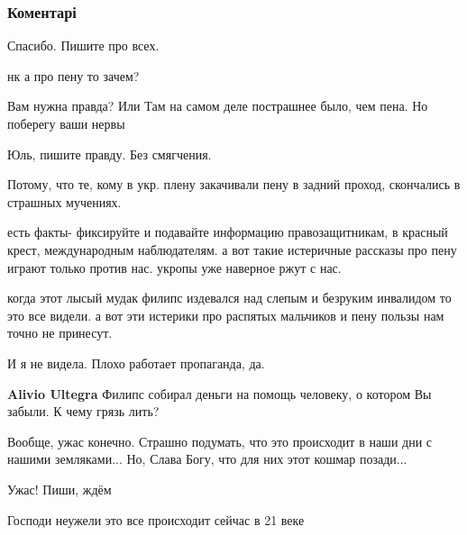  
 
 
 
 
\subsubsection{Коментарі}

\begin{itemize} %
Спасибо.
Пишите про всех.

нк а про пену то зачем?

\begin{itemize} %
Вам нужна правда? Или
Там на самом деле пострашнее было, чем пена. Но поберегу ваши нервы

Юль, пишите правду. Без смягчения.

Потому, что те, кому в укр. плену закачивали пену в задний проход, скончались в страшных мучениях.

есть факты- фиксируйте и подавайте информацию правозащитникам, в красный крест, международным наблюдателям. а вот такие истеричные рассказы про пену играют только против нас. укропы уже наверное ржут с нас.

когда этот лысый мудак филипс издевался над слепым и безруким инвалидом то это все видели. а вот эти истерики про распятых мальчиков и пену пользы нам точно не принесут.

И я не видела. Плохо работает пропаганда, да.

\textbf{Alivio Ultegra} Филипс собирал деньги на помощь человеку, о котором Вы забыли. К чему грязь лить?
\end{itemize} %

Вообще, ужас конечно. Страшно подумать, что это происходит в наши дни с нашими земляками... Но, Слава Богу, что для них этот кошмар позади...

Ужас! Пиши, ждём

Господи неужели это все происходит сейчас в 21 веке


\end{itemize}
